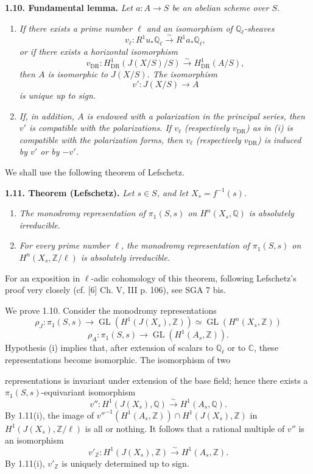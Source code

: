 \documentclass[10pt]{article}
\newcommand{\C}{\mathbb C}
\newcommand{\Q}{\mathbb Q}
\newcommand{\Z}{\mathbb Z}
\newcommand{\DR}{\mathrm{DR}}
\newcommand{\GL}{\operatorname{GL}}
\newcommand{\iso}{\xrightarrow{\sim}}
\newcommand{\sourcebreak}{\clearpage}
\begin{document}
\noindent\textbf{1.10. Fundamental lemma.} \emph{Let \(a:A\to S\) be an abelian scheme over \(S\).}
\begin{enumerate}[label=(\roman*)]
\item \emph{If there exists a prime number \(\ell\) and an isomorphism of \(\Q_\ell\)-sheaves}
\[
 v_\ell:R^1u_*\Q_\ell\iso R^1a_*\Q_\ell,
\]
\emph{or if there exists a horizontal isomorphism}
\[
 v_{\DR}:H^1_{\DR}(J(X/S)/S)\iso H^1_{\DR}(A/S),
\]
\emph{then \(A\) is isomorphic to \(J(X/S)\). The isomorphism}
\[
 v':J(X/S)\longrightarrow A
\]
\emph{is unique up to sign.}
\item \emph{If, in addition, \(A\) is endowed with a polarization in the principal series, then \(v'\) is compatible with the polarizations. If \(v_\ell\) (respectively \(v_{\DR}\)) as in (i) is compatible with the polarization forms, then \(v_\ell\) (respectively \(v_{\DR}\)) is induced by \(v'\) or by \(-v'\).}
\end{enumerate}

We shall use the following theorem of Lefschetz.

\noindent\textbf{1.11. Theorem (Lefschetz).} \emph{Let \(s\in S\), and let \(X_s=f^{-1}(s)\).}
\begin{enumerate}[label=(\roman*)]
\item \emph{The monodromy representation of \(\pi_1(S,s)\) on \(H^n(X_s,\Q)\) is absolutely irreducible.}
\item \emph{For every prime number \(\ell\), the monodromy representation of \(\pi_1(S,s)\) on \(H^n(X_s,\Z/\ell)\) is absolutely irreducible.}
\end{enumerate}
For an exposition in \(\ell\)-adic cohomology of this theorem, following Lefschetz's proof very closely (cf. [6] Ch. V, III p. 106), see SGA 7 bis.

We prove 1.10. Consider the monodromy representations
\[
\rho_J:\pi_1(S,s)\longrightarrow\GL(H^1(J(X_s),\Z))\simeq\GL(H^n(X_s,\Z))
\]
\[
\rho_A:\pi_1(S,s)\longrightarrow\GL(H^1(A_s,\Z)).
\]
Hypothesis (i) implies that, after extension of scalars to \(\Q_\ell\) or to \(\C\), these representations become isomorphic. The isomorphism of two

\sourcebreak
representations is invariant under extension of the base field; hence there exists a \(\pi_1(S,s)\)-equivariant isomorphism
\[
v'':H^1(J(X_s),\Q)\iso H^1(A_s,\Q).
\]
By 1.11(i), the image of \(v''^{-1}(H^1(A_s,\Z))\cap H^1(J(X_s),\Z)\) in \(H^1(J(X_s),\Z/\ell)\) is all or nothing. It follows that a rational multiple of \(v''\) is an isomorphism
\[
v'_\Z:H^1(J(X_s),\Z)\iso H^1(A_s,\Z).
\]
By 1.11(i), \(v'_\Z\) is uniquely determined up to sign.
\end{document}

